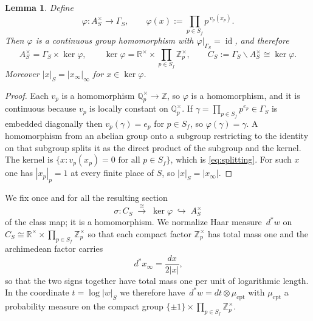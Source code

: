\documentclass[11pt]{amsart}
\newtheorem{lemma}[theorem]{Lemma}
\theoremstyle{definition}
\theoremstyle{remark}
\newcommand{\R}{\mathbb R}
\newcommand{\Z}{\mathbb Z}
\newcommand{\Q}{\mathbb Q}
\newcommand{\dstar}{\,d^{*}}
\newcommand{\id}{\operatorname{id}}
\begin{document}
\begin{lemma}\label{thm:split}
Define
\begin{equation}\label{eq:phi}
\varphi:A_S^{\times}\longrightarrow\Gamma_S,\qquad
\varphi(x):=\prod_{p\in S_f}p^{\,v_p(x_p)} .
\end{equation}
Then $\varphi$ is a continuous group homomorphism with
$\varphi|_{\Gamma_S}=\id$, and therefore
\begin{equation}\label{eq:splitting}
A_S^{\times}=\Gamma_S\times\ker\varphi,\qquad
\ker\varphi=\R^{\times}\times\prod_{p\in S_f}\Z_p^{\times},\qquad
C_S:=\Gamma_S\backslash A_S^{\times}\cong\ker\varphi .
\end{equation}
Moreover $|x|_S=|x_{\infty}|_{\infty}$ for $x\in\ker\varphi$.
\end{lemma}

\begin{proof}
Each $v_p$ is a homomorphism $\Q_p^{\times}\to\Z$, so $\varphi$ is a
homomorphism, and it is continuous because $v_p$ is locally constant on
$\Q_p^{\times}$.  If $\gamma=\prod_{p\in S_f}p^{e_p}\in\Gamma_S$ is embedded
diagonally then $v_p(\gamma)=e_p$ for $p\in S_f$, so $\varphi(\gamma)=\gamma$.
A homomorphism from an abelian group onto a subgroup restricting to the
identity on that subgroup splits it as the direct product of the subgroup and
the kernel.  The kernel is $\{x: v_p(x_p)=0\text{ for all }p\in S_f\}$, which
is \eqref{eq:splitting}.  For such $x$ one has $|x_p|_p=1$ at every finite
place of $S$, so $|x|_S=|x_{\infty}|$.
\end{proof}

We fix once and for all the resulting section
\begin{equation}\label{eq:section}
\sigma: C_S\;\xrightarrow{\ \cong\ }\;\ker\varphi\;\hookrightarrow\;A_S^{\times}
\end{equation}
of the class map; it is a homomorphism.  We normalize Haar measure
$\dstar w$ on $C_S\cong\R^{\times}\times\prod_{p\in S_f}\Z_p^{\times}$ so that
each compact factor $\Z_p^{\times}$ has total mass one and the archimedean
factor carries
\begin{equation}\label{eq:archmeasure}
\dstar x_{\infty}=\frac{dx}{2|x|},
\end{equation}
so that the two signs together have total mass one per unit of logarithmic
length.  In the coordinate $t=\log|w|_S$ we therefore have
$\dstar w=dt\otimes\mu_{\mathrm{cpt}}$ with $\mu_{\mathrm{cpt}}$ a probability
measure on the compact group $\{\pm1\}\times\prod_{p\in S_f}\Z_p^{\times}$.
\end{document}
